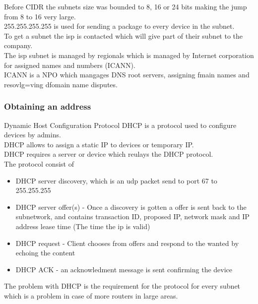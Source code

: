 \documentclass[12pt, a4paper]{article}
\begin{document}
				Before CIDR the subnets size was bounded to 8, 16 or 24 bits making the jump from 8 to 16 very large.\\
				255.255.255.255 is used for sending a package to every device in the subnet.\\
				To get a subnet the isp is contacted which will give part of their subnet to the company.\\
				The isp subnet is managed by regionals which is managed by Internet corporation for assigned names and numbers (ICANN).\\
				ICANN is a NPO which mangages DNS root servers, assigning fmain names and resovlg=ving dfomain name disputes.\\ 
			\subsubsection{Obtaining an address}
				Dynamic Host Configuration Protocol DHCP is a protocol used to configure devices by admins.\\
				DHCP allows to assign a static IP to devices or temporary IP.\\
				DHCP requires a server or device which reulays the DHCP protocol.\\
				The protocol consist of
				\begin{itemize}
					\item DHCP server discovery, which is an udp packet send to port 67 to 255.255.255
					\item DHCP server offer(s) - Once a discovery is gotten a offer is sent back to the subnetwork, and contains transaction ID, proposed IP, network mask and IP address lease time (The time the ip is valid)
					\item DHCP request - Client chooses from offers and respond to the wanted by echoing the content
					\item DHCP ACK - an acknowledment message is sent confirming the device
				\end{itemize}
				The problem with DHCP is the requirement for the protocol for every subnet which is a problem in case of more routers in large areas.
\end{document}
